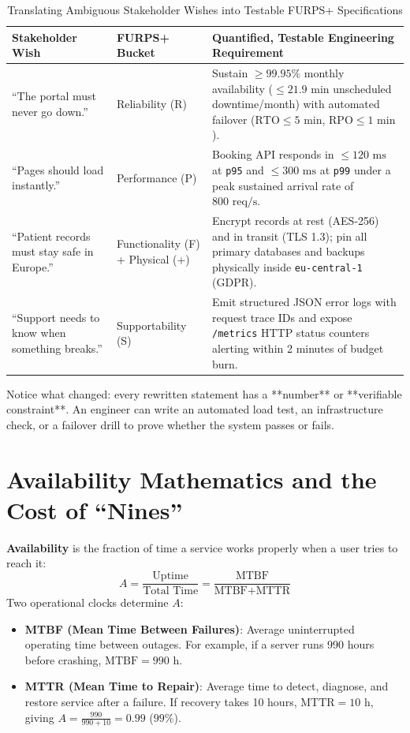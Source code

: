 \begin{table}[htbp]
\centering\scriptsize
\begin{tabular}{p{3.6cm}p{2.2cm}p{7.8cm}}
\toprule
\textbf{Stakeholder Wish} & \textbf{FURPS+ Bucket} & \textbf{Quantified, Testable Engineering Requirement} \\
\midrule
``The portal must never go down.'' & Reliability (R) & Sustain $\ge 99.95\%$ monthly availability ($\le 21.9\text{ min}$ unscheduled downtime/month) with automated failover ($\text{RTO} \le 5\text{ min}$, $\text{RPO} \le 1\text{ min}$). \\
``Pages should load instantly.'' & Performance (P) & Booking API responds in $\le 120\text{ ms}$ at \texttt{p95} and $\le 300\text{ ms}$ at \texttt{p99} under a peak sustained arrival rate of $800\text{ req/s}$. \\
``Patient records must stay safe in Europe.'' & Functionality (F) + Physical (+) & Encrypt records at rest (AES-256) and in transit (TLS 1.3); pin all primary databases and backups physically inside \texttt{eu-central-1} (GDPR). \\
``Support needs to know when something breaks.'' & Supportability (S) & Emit structured JSON error logs with request trace IDs and expose \texttt{/metrics} HTTP status counters alerting within 2 minutes of budget burn. \\
\bottomrule
\end{tabular}
\caption{Translating Ambiguous Stakeholder Wishes into Testable FURPS+ Specifications}
\label{tab:v5-ch01-translation}
\end{table}

Notice what changed: every rewritten statement has a **number** or **verifiable constraint**. An engineer can write an automated load test, an infrastructure check, or a failover drill to prove whether the system passes or fails.

\section{Availability Mathematics and the Cost of ``Nines''}

\textbf{Availability} is the fraction of time a service works properly when a user tries to reach it:
\begin{equation}
A = \frac{\text{Uptime}}{\text{Total Time}} = \frac{\text{MTBF}}{\text{MTBF} + \text{MTTR}}
\end{equation}
Two operational clocks determine $A$:
\begin{itemize}[leftmargin=18pt]
  \item \textbf{MTBF (Mean Time Between Failures)}: Average uninterrupted operating time between outages. For example, if a server runs 990 hours before crashing, $\text{MTBF} = 990\text{ h}$.
  \item \textbf{MTTR (Mean Time to Repair)}: Average time to detect, diagnose, and restore service after a failure. If recovery takes 10 hours, $\text{MTTR} = 10\text{ h}$, giving $A = \frac{990}{990 + 10} = 0.99$ ($99\%$).
\end{itemize}

